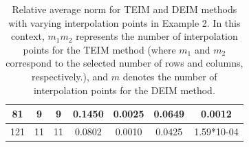 \documentclass{article}
\begin{document}
\begin{table}[]
{\begin{tabular}{|c|c|c|c|c|c|c|}
81                                   & 9                         & 9                         & 0.1450                                                                                                                                                                                        & 0.0025                                                                                                                                                                                       & 0.0649                                                                                                                                                                                                                                                   & 0.0012                                                                                                                                                                                                                                                \\ \hline
121                                  & 11                        & 11                        & 0.0802                                                                                                                                                                                        & 0.0010                                                                                                                                                                                       & 0.0425                                                                                                                                                                                                                                                   & 1.59*10-04   \\ \hline                                                                                                                                                                                                                                        
\end{tabular}%
}
 \caption{ Relative average norm for TEIM and DEIM methods with varying interpolation points in Example 2. In this context, $m_1m_2$ represents the number of interpolation points for the TEIM method (where $m_1$ and $m_2$ correspond to the selected number of rows and columns, respectively.), and $m$ denotes the number of interpolation points for the DEIM method.}
 
 \label{tab:table7}
\end{table}
\end{document}

